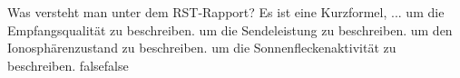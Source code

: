     {Was versteht man unter dem RST-Rapport? Es ist eine Kurzformel, ...}
    {um die Empfangsqualität zu beschreiben.}
    {um die Sendeleistung zu beschreiben.}
    {um den Ionosphärenzustand zu beschreiben.}
    {um die Sonnenfleckenaktivität zu beschreiben.}
    {false}{false}